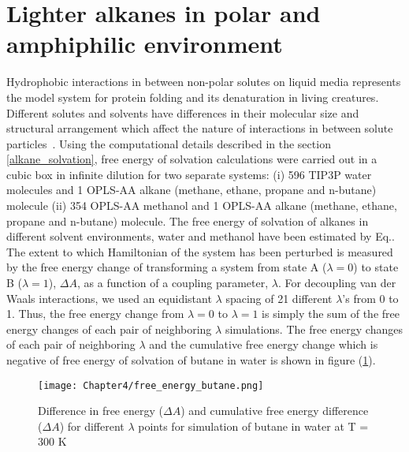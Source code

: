 \section{Lighter alkanes in polar and amphiphilic environment} \label{solvation}

Hydrophobic interactions in between non-polar solutes on liquid media represents the model system for protein folding and its denaturation in living creatures. Different solutes and solvents have differences in their molecular size and structural arrangement which affect the nature of interactions in between solute particles~\citep{Sobolewski2007}. Using the computational  details described in the section \ref{alkane_solvation}, free energy of solvation calculations  were carried out in a  cubic box in infinite dilution for two separate systems: (i) 596 TIP3P water molecules and 1 OPLS-AA alkane (methane, ethane, propane and n-butane) molecule (ii) 354 OPLS-AA methanol  and 1 OPLS-AA alkane (methane, ethane, propane and n-butane) molecule. The free energy of solvation of alkanes in different solvent environments, water and methanol have been  estimated by Eq.\label{helmoltzfeee}. The extent to which Hamiltonian of the system has been perturbed is measured by the free energy change of transforming a system from state A ($\lambda=0$) to state B ($\lambda= 1$), $\Delta A$, as a function of a coupling parameter, $\lambda$. For decoupling van der Waals  interactions,  we used  an equidistant $\lambda$ spacing of 21 different $\lambda$'s from 0 to 1.  Thus, the free energy change from $\lambda = 0$ to $\lambda = 1$ is simply the sum of the free energy changes of each pair of neighboring $\lambda$ simulations. The free energy changes of each pair of neighboring $\lambda$ and the cumulative free energy change which is negative of free energy of solvation of butane in water is shown in figure (\ref{freeintegral}).


\begin{figure}[h!]
 \centering
\texttt{[image: Chapter4/free\_energy\_butane.png]}
\caption[Difference in free energy  and cumulative free energy difference  for different lambda points for simulation of butane in water.] { Difference in free energy ($\Delta A$) and cumulative free energy difference ($\Delta A$) for different $\lambda$ points for simulation of butane in water at T = 300 K}
\label{freeintegral}
\end{figure}
 
